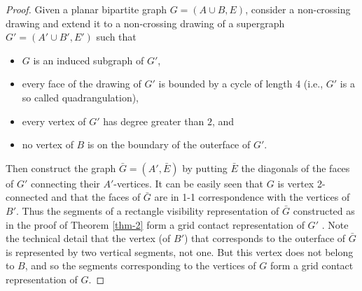\begin{proof}
	Given a planar bipartite graph $G = (A \cup B, E)$, consider a non-crossing drawing and extend it to a non-crossing drawing of a supergraph $G' = (A' \cup B' , E')$ such that
	
	\begin{itemize}
		\item $G$ is an induced subgraph of $G'$,
		\item every face of the drawing of $G'$ is bounded by a cycle of length 4 (i.e., $G'$ is a so called quadrangulation),
		\item every vertex of $G'$ has degree greater than $2$, and
		\item no vertex of $B$ is on the boundary of the outerface of $G'$. 
	\end{itemize}
	
	Then construct the graph $\bar{G} = (A', \bar{E})$ by putting $\bar{E}$ the diagonals of the faces of $G'$ connecting their $A'$-vertices. It can be easily seen that $G$ is vertex 2-connected and that the faces of $\bar{G}$ are in 1-1 correspondence with the vertices of $B'$. Thus the segments of a rectangle visibility representation of $\bar{G}$ constructed as in the proof of Theorem \ref{thm-2} form a grid contact representation of $G'$ . Note the technical detail that the vertex (of $B'$) that corresponds to the outerface of $\bar{G}$ is represented by two vertical segments, not one. But this vertex does not belong to $B$, and so the segments corresponding to the vertices of $G$ form a grid contact representation of $G$.
\end{proof}

